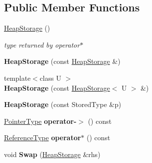 \subsection*{Public Member Functions}
\begin{DoxyCompactItemize}
\item 
\hypertarget{classLoki_1_1HeapStorage_acdfa8becf0edde78add788797126b53c}{}\hyperlink{classLoki_1_1HeapStorage_acdfa8becf0edde78add788797126b53c}{Heap\+Storage} ()\label{classLoki_1_1HeapStorage_acdfa8becf0edde78add788797126b53c}

\begin{DoxyCompactList}\small\item\em type returned by operator$\ast$ \end{DoxyCompactList}\item 
\hypertarget{classLoki_1_1HeapStorage_a8b87d655807788f3fd05b64b68bbe1e0}{}{\bfseries Heap\+Storage} (const \hyperlink{classLoki_1_1HeapStorage}{Heap\+Storage} \&)\label{classLoki_1_1HeapStorage_a8b87d655807788f3fd05b64b68bbe1e0}

\item 
\hypertarget{classLoki_1_1HeapStorage_afb4c42a9de2585f369c0c9f874c0605b}{}{\footnotesize template$<$class U $>$ }\\{\bfseries Heap\+Storage} (const \hyperlink{classLoki_1_1HeapStorage}{Heap\+Storage}$<$ U $>$ \&)\label{classLoki_1_1HeapStorage_afb4c42a9de2585f369c0c9f874c0605b}

\item 
\hypertarget{classLoki_1_1HeapStorage_af28e5a0db4045036fe236b895b3789ff}{}{\bfseries Heap\+Storage} (const Stored\+Type \&p)\label{classLoki_1_1HeapStorage_af28e5a0db4045036fe236b895b3789ff}

\item 
\hypertarget{classLoki_1_1HeapStorage_ae21e1571b72711de6679feac2ce54bfe}{}\hyperlink{classLoki_1_1HeapStorage_a11ad403d98af5c6671f47d433d67201d}{Pointer\+Type} {\bfseries operator-\/$>$} () const \label{classLoki_1_1HeapStorage_ae21e1571b72711de6679feac2ce54bfe}

\item 
\hypertarget{classLoki_1_1HeapStorage_ac880ee6cdf9f0e5becb913dcc0a45f2b}{}\hyperlink{classLoki_1_1HeapStorage_a3fee3ebeb24babac70bd87cbe8006e99}{Reference\+Type} {\bfseries operator$\ast$} () const \label{classLoki_1_1HeapStorage_ac880ee6cdf9f0e5becb913dcc0a45f2b}

\item 
\hypertarget{classLoki_1_1HeapStorage_a2e90b7e5c2856bc35ca20a8f4087c771}{}void {\bfseries Swap} (\hyperlink{classLoki_1_1HeapStorage}{Heap\+Storage} \&rhs)\label{classLoki_1_1HeapStorage_a2e90b7e5c2856bc35ca20a8f4087c771}

\end{DoxyCompactItemize}
